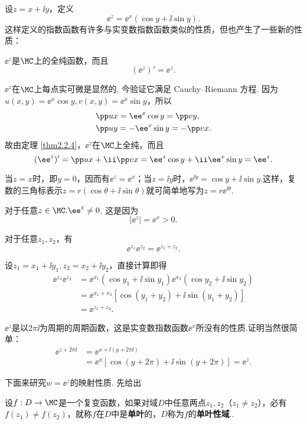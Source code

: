 设$z=x+\ii y$，定义
\[\ee^z=\ee^x(\cos y+\ii \sin y).\]
这样定义的指数函数有许多与实变数指数函数类似的性质，但也产生了一些新的性质：
\begin{eenum}\ccwd
\item $\ee^z$是$\MC$上的全纯函数，而且
  \[(\ee^z)'=\ee^z.\]

  $\ee^z$在$\MC$上每点实可微是显然的, 今验证它满足 Cauchy--Riemann 方程. 因为$u(x,y)=\ee^x\cos y,v(x,y)=\ee^x\sin y$，所以
  \begin{align*}
  &\pp ux=\ee^x\cos y=\pp vy,\\
  &\pp uy=-\ee^x\sin y=-\pp vx.
  \end{align*}
故由定理 \ref{thm2.2.4}，$\ee^z$在$\MC$上全纯，而且
\[(\ee^z)'=\pp ux+\ii \pp vx=\ee^x\cos y+\ii \ee^x\sin y=\ee^z.\]

\item 当$z=x$时，即$y=0$，因而有$\ee^z=\ee^x$；当$z=\ii y$时，$\ee^{\ii y}=\cos y+\ii\sin y$.这样，复数的三角标表示$z=r(\cos\theta+\ii\sin\theta)$就可简单地写为$z=r\ee^{\ii\theta}$.

\item 对于任意$z\in \MC.\ee^z\ne0$. 这是因为
\[|\ee^z|=\ee^x>0.\]

\item 对于任意$z_1,z_2$，有
\[\ee^{z_1}\ee^{z_2}=\ee^{z_1+z_2}.\]

设$z_1=x_1+\ii y_1,z_2=x_2+\ii y_2$，直接计算即得
\begin{align*}
\ee^{z_1}\ee^{z_2}&=\ee^{x_1}(\cos y_1+\ii\sin y_1)\ee^{x_2}(\cos y_2+\ii \sin y_2)\\
&=\ee^{x_1+x_2}[\cos(y_1+y_2)+\ii\sin(y_1+y_2)]\\
&=\ee^{z_1+z_2}.
\end{align*}

\item $\ee^z$是以$2\pi\ii$为周期的周期函数，这是实变数指数函数$\ee^x$所没有的性质.证明当然很简单：
\begin{align*}
\ee^{z+2\pi\ii}&=\ee^{x+\ii(y+2\pi\ii)}\\
&=\ee^x[\cos(y+2\pi)+\ii\sin(y+2\pi)]=\ee^z.
\end{align*}
\end{eenum}

下面来研究$w=\ee^z$的映射性质. 先给出
\begin{definition}\label{def2.4.1}
设$f:D\to\MC$是一个复变函数，如果对域$D$中任意两点$z_1,z_2$（$z_1\ne z_2$），必有$f(z_1)\ne f(z_2)$，就称$f$在$D$中是\textbf{单叶}的，$D$称为$f$的\textbf{单叶性域}..
\end{definition}

